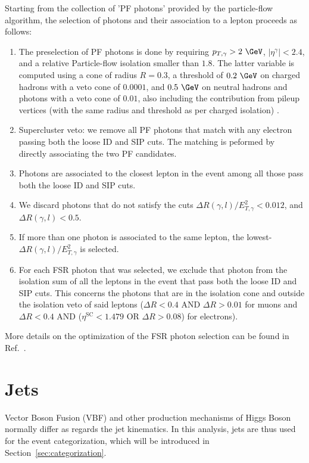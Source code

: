 Starting from the collection of 'PF photons' provided by the particle-flow algorithm, the selection of photons and their association to a lepton proceeds as follows:
\begin{enumerate}
\item The preselection of PF photons is done by requiring $p_{T,\gamma} > 2~\GeV$, $|\eta^{\gamma}| < 2.4$, and a relative Particle-flow isolation smaller than $1.8$. The latter variable is computed using a cone of radius $R=0.3$, a threshold of $0.2~\GeV$ on charged hadrons with a veto cone of $0.0001$, and $0.5~\GeV$ on neutral hadrons and photons with a veto cone of $0.01$, also including the contribution from pileup vertices (with the same radius and threshold as per charged isolation) .
\item Supercluster veto: we remove all PF photons that match with any electron passing both the loose ID and SIP cuts. The matching is peformed by directly associating the two PF candidates.
\item Photons are associated to the closest lepton in the event among all those pass both the loose ID and SIP cuts.
\item We discard photons that do not satisfy the cuts $\Delta R(\gamma,l)/E_{T,\gamma}^2 < 0.012$, and $\Delta R(\gamma,l)<0.5$.
\item If more than one photon is associated to the same lepton, the lowest-$\Delta R(\gamma,l)/E_{T,\gamma}^2$ is selected.
\item For each FSR photon that was selected, we exclude that photon from the isolation sum of all the leptons in the event that pass both the loose ID and SIP cuts. This concerns the photons that are in the isolation cone and outside the isolation veto of said leptons ($\Delta R < 0.4$ AND $\Delta R > 0.01$ for muons and $\Delta R < 0.4$ AND ($\eta^{\text{SC}} < 1.479$ OR $\Delta R > 0.08$) for electrons).
\end{enumerate}

More details on the optimization of the FSR photon selection can be found in Ref.~\cite{AN-15-277, AN-16-217}.

\section{Jets}
\label{sec:jets}

Vector Boson Fusion (VBF) and other production mechanisms of Higgs Boson normally differ as regards the jet kinematics. 
In this analysis, jets are thus used for the event categorization, which will be introduced in Section~\ref{sec:categorization}.

